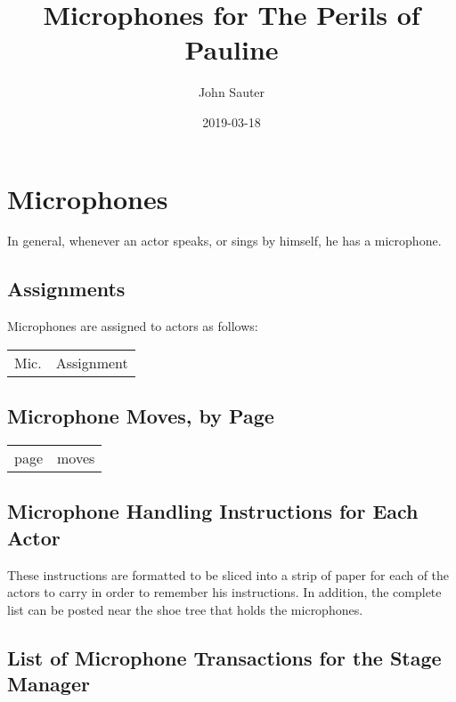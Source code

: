 \documentclass[letterpaper]{article}
\title{Microphones for The Perils of Pauline}
\author{John Sauter}
\date{2019-03-18}
\begin{document}
\maketitle
\tableofcontents
\newpage

\section {Microphones}
In general, whenever an actor speaks, or sings by himself, he has a microphone.

\subsection {Assignments}
Microphones are assigned to actors as follows:

\begin{center}
\begin{longtable}{|l|m{7in}|}
\hline Mic. & Assignment \endhead \hline

\end{longtable}
\end{center}

\subsection {Microphone Moves, by Page}

\begin{center}
\begin{longtable}{|l|m{7in}|}
\hline page & moves \endhead \hline

\end{longtable}
\end{center}

\subsection {Microphone Handling Instructions for Each Actor}

These instructions are formatted to be sliced into a strip of paper
for each of the actors to carry in order to remember his instructions.
In addition, the complete list can be posted near the shoe tree that
holds the microphones.

\vskip 0.25in

{\setlength{\parindent}{0in}

}

\subsection {List of Microphone Transactions for the Stage Manager}
\end{document}
